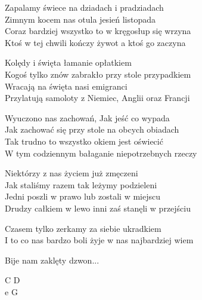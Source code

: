 \begin{text}
    Zapalamy świece na dziadach i pradziadach\\
    Zimnym kocem nas otula jesień listopada\\
    Coraz bardziej wszystko to w kręgosłup się wrzyna\\
    Ktoś w tej chwili kończy żywot a ktoś go zaczyna

    Kolędy i święta łamanie opłatkiem\\
    Kogoś tylko znów zabrakło przy stole przypadkiem\\
    Wracają na święta nasi emigranci\\
    Przylatują samoloty z Niemiec, Anglii oraz Francji

    Wyuczono nas zachowań, Jak jeść co wypada\\
    Jak zachować się przy stole na obcych obiadach\\
    Tak trudno to wszystko okiem jest oświecić\\
    W tym codziennym bałaganie niepotrzebnych rzeczy

    Niektórzy z nas życiem już zmęczeni\\
    Jak staliśmy razem tak leżymy podzieleni\\
    Jedni poszli w prawo lub zostali w miejscu\\
    Drudzy całkiem w lewo inni zaś stanęli w przejściu

    Czasem tylko zerkamy za siebie ukradkiem\\
    I to co nas bardzo boli żyje w nas najbardziej wiem

    \vin Bije nam zaklęty dzwon...

\end{text}
\begin{chord}
    C D\\
	e G
\end{chord}